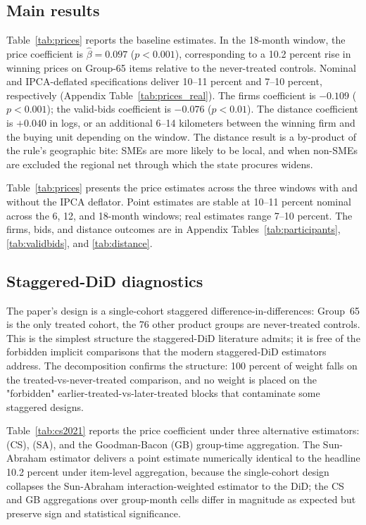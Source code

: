 \subsection{Main results}

Table~\ref{tab:prices} reports the baseline estimates. In the 18-month window, the price coefficient is $\hat\beta = 0.097$ ($p < 0.001$), corresponding to a 10.2 percent rise in winning prices on Group-65 items relative to the never-treated controls. Nominal and IPCA-deflated specifications deliver 10--11 percent and 7--10 percent, respectively (Appendix Table~\ref{tab:prices_real}). The firms coefficient is $-0.109$ ($p < 0.001$); the valid-bids coefficient is $-0.076$ ($p < 0.01$). The distance coefficient is $+0.040$ in logs, or an additional 6--14 kilometers between the winning firm and the buying unit depending on the window. The distance result is a by-product of the rule's geographic bite: SMEs are more likely to be local, and when non-SMEs are excluded the regional net through which the state procures widens.



Table~\ref{tab:prices} presents the price estimates across the three windows with and without the IPCA deflator. Point estimates are stable at 10--11 percent nominal across the 6, 12, and 18-month windows; real estimates range 7--10 percent. The firms, bids, and distance outcomes are in Appendix Tables~\ref{tab:participants}, \ref{tab:validbids}, and \ref{tab:distance}.

\subsection{Staggered-DiD diagnostics}

The paper's design is a single-cohort staggered difference-in-differences: Group~65 is the only treated cohort, the 76 other product groups are never-treated controls. This is the simplest structure the staggered-DiD literature admits; it is free of the forbidden implicit comparisons that the modern staggered-DiD estimators address. The \citet{goodmanbacon2021} decomposition confirms the structure: 100 percent of weight falls on the treated-vs-never-treated comparison, and no weight is placed on the "forbidden" earlier-treated-vs-later-treated blocks that contaminate some staggered designs.

Table~\ref{tab:cs2021} reports the price coefficient under three alternative estimators: \citet{callaway2021} (CS), \citet{sun2021} (SA), and the Goodman-Bacon (GB) group-time aggregation. The Sun-Abraham estimator delivers a point estimate numerically identical to the headline 10.2 percent under item-level aggregation, because the single-cohort design collapses the Sun-Abraham interaction-weighted estimator to the DiD; the CS and GB aggregations over group-month cells differ in magnitude as expected but preserve sign and statistical significance.

